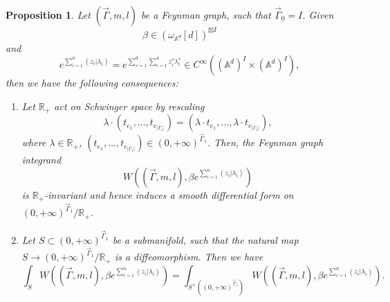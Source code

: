 \documentclass[11pt]{amsart}
\newtheorem{prop}[thm]{Proposition}
\theoremstyle{definition}
\theoremstyle{remark}
\numberwithin{equation}{section}
\begin{document}
\begin{prop}\label{useful property}
    Let $(\vec{\Gamma},m,l)$ be a Feynman graph, such that $\vec{\Gamma}_{0}= I$. Given
    $$
    \beta\in (\omega_{\mathbb{A}^{d}}[d])^{\boxtimes I}
    $$
    and
    $$
e^{\sum\limits_{i=1}^{n}(z_{i}|\lambda_{i})}=e^{\sum\limits_{s=1}^{d}\sum\limits_{i=1}^{n}z^{s}_{i}\lambda^{s}_{i}}\in C^{\infty}((\mathbb{A}^{d})^{ I}\times (\mathbb{A}^{d})^{ I}),
    $$
    then we have the following consequences:
    \begin{enumerate}
        \item
        Let $\mathbb{R}_{+}$ act on Schwinger space by rescaling
        $$
        \lambda\cdot(t_{e_{1}},\dots,t_{e_{|\Gamma_{1}|}})=(\lambda\cdot t_{e_{1}},\dots,\lambda\cdot t_{e_{|\Gamma_{1}|}}),
        $$
        where $\lambda\in \mathbb{R}_+$, $(t_{e_{1}},\dots,t_{e_{|\Gamma_{1}|}})\in (0,+\infty)^{\vec{\Gamma}_{1}}$.
        Then, the Feynman graph integrand
        $$
        W((\vec{\Gamma},m,l),\beta e^{\sum\limits_{i=1}^{n}(z_{i}|\lambda_{i})})
        $$
        is $\mathbb{R}_+$-invariant and hence induces a smooth differential form on $(0,+\infty)^{\vec{\Gamma}_{1}}/\mathbb{R}_+$.
        \item Let $S\subset(0,+\infty)^{\vec{\Gamma}_{1}}$ be a submanifold, such that the natural map $S\rightarrow(0,+\infty)^{\vec{\Gamma}_{1}}/\mathbb{R}_+$ is a diffeomorphism. Then we have
        $$
        \int_{S}W((\vec{\Gamma},m,l),\beta e^{\sum\limits_{i=1}^{n}(z_{i}|\lambda_{i})})=
        \int_{S^{+}((0,+\infty)^{\vec{\Gamma}_{1}})}W((\vec{\Gamma},m,l),\beta e^{\sum\limits_{i=1}^{n}(z_{i}|\lambda_{i})}).
        $$
    \end{enumerate}
\end{prop}
\end{document}
